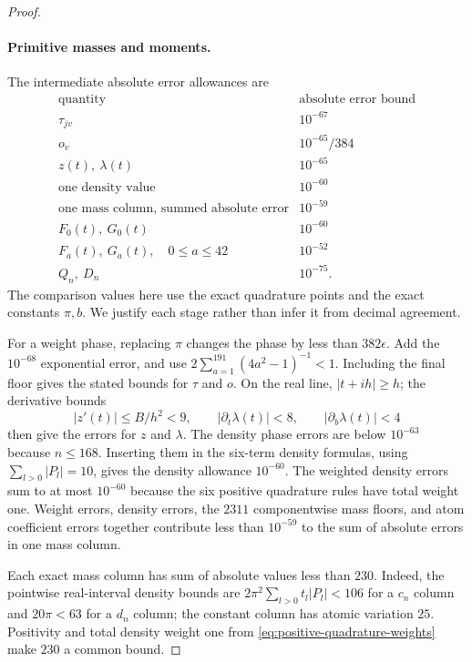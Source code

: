 \begin{proof}
\paragraph{Primitive masses and moments.}
The intermediate absolute error allowances are
\begin{equation}\label{eq:primitive-roundoff-budgets}
\begin{array}{c|c}
\text{quantity}&\text{absolute error bound}\\ \hline
 \tau_{jv}&10^{-67}\\
 o_v&10^{-65}/384\\
 z(t),\ \lambda(t)&10^{-65}\\
 \text{one density value}&10^{-60}\\
 \text{one mass column, summed absolute error}&10^{-59}\\
 F_0(t),\ G_0(t)&10^{-60}\\
 F_a(t),\ G_a(t),\quad0\le a\le42&10^{-52}\\
 Q_n,\ D_n&10^{-75}.
\end{array}
\end{equation}
The comparison values here use the exact quadrature points and the exact
constants $\pi,b$.  We justify each stage rather than infer it from decimal
agreement.

For a weight phase, replacing $\pi$ changes the phase by less than
$382\epsilon$.  Add the $10^{-68}$ exponential error, and use
$2\sum_{a=1}^{191}(4a^2-1)^{-1}<1$.  Including the final floor gives
the stated bounds for $\tau$ and $o$.  On the real line, $|t+ih|\ge h$;
the derivative bounds
\[
 |z'(t)|\le B/h^2<9,\qquad
 |\partial_t\lambda(t)|<8,\qquad |\partial_b\lambda(t)|<4
\]
then give the errors for $z$ and $\lambda$.  The density phase errors
are below $10^{-63}$ because $n\le168$.  Inserting them in the six-term
density formulas, using $\sum_{l>0}|P_l|=10$, gives the density allowance
$10^{-60}$. The weighted density errors sum to at most $10^{-60}$ because
the six positive quadrature rules have total weight one. Weight errors,
density errors, the $2311$ componentwise mass floors, and atom coefficient
errors together contribute less than $10^{-59}$
to the sum of absolute errors in one mass column.

Each exact mass column has sum of absolute values less than $230$.  Indeed,
the pointwise real-interval density bounds are
$2\pi^2\sum_{l>0}t_l|P_l|<106$ for a $c_n$ column and $20\pi<63$ for a
$d_n$ column; the constant column has atomic variation $25$.  Positivity
and total density weight one from \eqref{eq:positive-quadrature-weights}
make $230$ a common bound.


\end{proof}
